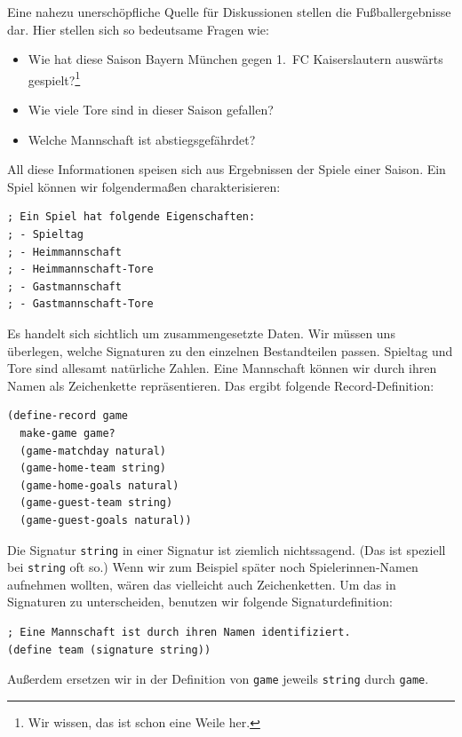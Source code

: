 %
Eine nahezu unerschöpfliche Quelle für Diskussionen stellen die
Fußballergebnisse dar.  Hier stellen sich so bedeutsame Fragen wie:
\begin{itemize}
\item Wie hat diese Saison Bayern München gegen 1.~FC Kaiserslautern
  auswärts gespielt?\footnote{Wir wissen, das ist schon eine Weile her.}
\item Wie viele Tore sind in dieser Saison gefallen?
\item Welche Mannschaft ist abstiegsgefährdet?
\end{itemize}
%
All diese Informationen speisen sich aus Ergebnissen der Spiele einer
Saison.  Ein Spiel können wir folgendermaßen charakterisieren:
%
\begin{lstlisting}
; Ein Spiel hat folgende Eigenschaften:
; - Spieltag
; - Heimmannschaft
; - Heimmannschaft-Tore
; - Gastmannschaft
; - Gastmannschaft-Tore
\end{lstlisting}
%
Es handelt sich sichtlich um zusammengesetzte Daten.  Wir müssen uns
überlegen, welche Signaturen zu den einzelnen Bestandteilen passen.
Spieltag und Tore sind allesamt natürliche Zahlen.  Eine Mannschaft können
wir durch ihren Namen als Zeichenkette repräsentieren.   Das ergibt
folgende Record-Definition:
\begin{lstlisting}
(define-record game
  make-game game?
  (game-matchday natural)
  (game-home-team string)
  (game-home-goals natural)
  (game-guest-team string)
  (game-guest-goals natural))
\end{lstlisting}
%
Die Signatur \lstinline{string} in einer Signatur ist ziemlich
nichtssagend.  (Das ist speziell bei \lstinline{string} oft so.)  Wenn
wir zum Beispiel später noch Spielerinnen-Namen aufnehmen wollten,
wären das vielleicht auch Zeichenketten.  Um das in Signaturen zu
unterscheiden, benutzen wir folgende Signaturdefinition:
%
\begin{lstlisting}
; Eine Mannschaft ist durch ihren Namen identifiziert.
(define team (signature string))
\end{lstlisting}
%
Außerdem ersetzen wir in der Definition von \lstinline{game} jeweils
\lstinline{string} durch \lstinline{game}.

